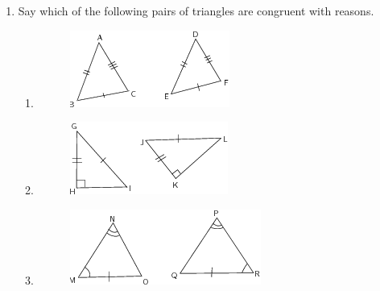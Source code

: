 \begin{enumerate}[noitemsep, label=\textbf{\arabic*}. ]
\begin{enumerate}[noitemsep, label=\textbf{\alph*}. ]
\begin{figure}[H]
 \end{figure}       \end{enumerate}
\label{m39368*uid126}\item Say which of the following pairs of triangles are congruent with reasons.
\label{m39368*id320498}\begin{enumerate}[noitemsep, label=\textbf{\alph*}. ] 
            \label{m39368*uid127}\item 
    \setcounter{subfigure}{0}
	\begin{figure}[H] %
    \begin{center}
    \label{m39368*id320512!!!underscore!!!media}\label{m39368*id320512!!!underscore!!!printimage}\includegraphics{col11306.imgs/m39368_MG10C13_060.png} %
      \vspace{2pt}
    \vspace{.1in}
    \end{center}
 \end{figure}       \label{m39368*uid128}\item 
    \setcounter{subfigure}{0}
	\begin{figure}[H] %
    \begin{center}
    \label{m39368*id320530!!!underscore!!!media}\label{m39368*id320530!!!underscore!!!printimage}\includegraphics{col11306.imgs/m39368_MG10C13_061.png} %
      \vspace{2pt}
    \vspace{.1in}
    \end{center}
 \end{figure}       \label{m39368*uid129}\item 
    \setcounter{subfigure}{0}
	\begin{figure}[H] %
    \begin{center}
    \label{m39368*id320548!!!underscore!!!media}\label{m39368*id320548!!!underscore!!!printimage}\includegraphics{col11306.imgs/m39368_MG10C13_062.png} %

\end{center}
\end{figure}
\end{enumerate}
\end{enumerate}

